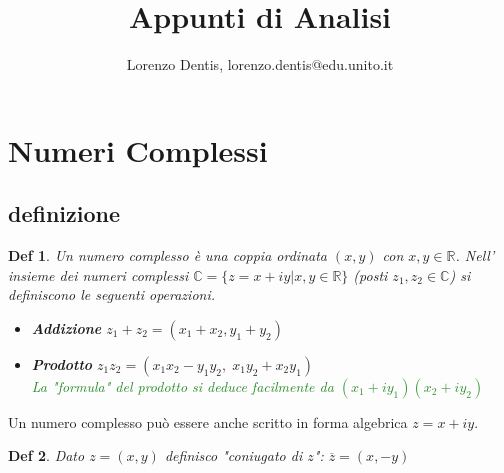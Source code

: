 \documentclass[a4paper]{article}
\newtheorem*{definition}{Def}
\newcommand{\appunto}[1]{\textcolor{ForestGreen}{#1}}
\begin{document}
\author{Lorenzo Dentis, lorenzo.dentis@edu.unito.it}
\title{Appunti di Analisi}
\maketitle
\tableofcontents
\newpage
\section{Numeri Complessi}
\subsection{definizione}
\begin{definition}
	Un numero complesso è una coppia ordinata $ (x,y) $ con $ x,y \in \mathbb{R} $.
	Nell' insieme dei numeri complessi $ \mathbb{C} = \{z = x + iy | x,y \in \mathbb{R}\} $ (posti $z_1,z_2 \in \mathbb{C}$) si definiscono le seguenti operazioni.
	\begin{itemize}
		\item[] \textbf{Addizione} $z_1+z_2 = (x_1+x_2, y_1 + y_2)$
		\item[] \textbf{Prodotto} $z_1z_2 = (x_1x_2 - y_1y_2,\; x_1y_2 + x_2y_1) $\\
			\appunto{La "formula" del prodotto si deduce facilmente da $(x_1 + iy_1) (x_2 + iy_2)$}
	\end{itemize}
\end{definition}
Un numero complesso può essere anche scritto in forma algebrica $z= x+iy$.
\begin{definition}
	Dato $z= (x,y)$ definisco "coniugato di $z$": $\overline z = (x,-y)$
\end{definition}
\end{document}
